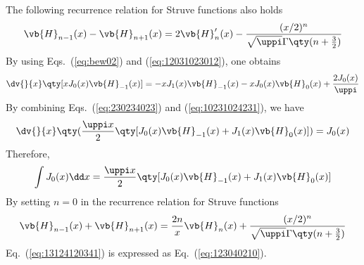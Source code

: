 The following recurrence relation for Struve functions also holds
\begin{equation}
    \vb{H}_{n-1}(x) -\vb{H}_{n+1} (x)
    = 2\vb{H}_n'(x)
    -\frac{(x/2)^n}{ \sqrt{\uppi}\Gamma\qty(n+\frac{3}{2})}
    \label{eq:12031023012}
\end{equation}
By using Eqs.~(\ref{eq:bew02}) and (\ref{eq:12031023012}),  one obtains 
\begin{equation}
    \dv{}{x}\qty[xJ_0(x)   \vb{H}_{-1}(x) ]
    = -xJ_1(x)\vb{H}_{-1}(x) -xJ_0(x)\vb{H}_0(x)
    +\frac{2J_0(x)}{\uppi}
    \label{eq:10231024231}
\end{equation}
By combining Eqs.~(\ref{eq:230234023}) and (\ref{eq:10231024231}), we have 
\begin{equation}
    \dv{}{x}\qty(\frac{\uppi x}{2}\qty[J_0(x)\vb{H}_{-1}(x) + J_1(x)\vb{H}_0(x)])
    = J_0(x)
    \label{eq:130123402}
\end{equation}
Therefore,
\begin{equation}
    \int J_0(x) \dd x
     =            \frac{\uppi x}{2}\qty[J_0(x)\vb{H}_{-1}(x) + J_1(x)\vb{H}_0(x)]
    \label{eq:13124120341}
\end{equation}
By setting $n=0$ in the recurrence relation for Struve functions
\begin{equation}
    \vb{H}_{n-1}(x) + \vb{H}_{n+1}(x)  = \frac{2n}{x} \vb{H}_n(x) +\frac{(x/2)^n}{\sqrt{\uppi}\Gamma\qty(n+\frac{3}{2})}
    \label{eq:120213124123}
\end{equation}
Eq.~(\ref{eq:13124120341}) is expressed as Eq.~(\ref{eq:123040210}).

